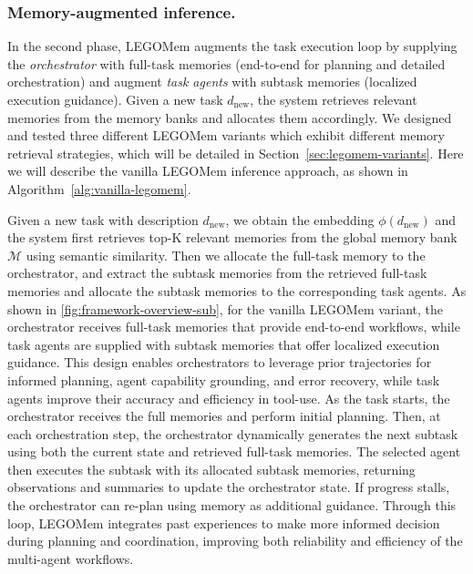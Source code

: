 \documentclass[sigconf]{aamas}
\newcommand{\legomem}{LEGOMem}
\begin{document}
\subsubsection{Memory-augmented inference.}

In the second phase, \legomem{} augments the task execution loop by supplying the \emph{orchestrator} with full-task memories (end-to-end for planning and detailed orchestration) and augment \emph{task agents} with subtask memories (localized execution guidance). Given a new task $d_{\text{new}}$, the system retrieves relevant memories from the memory banks and allocates them accordingly. We designed and tested three different \legomem{} variants which exhibit different memory retrieval strategies, which will be detailed in Section~\ref{sec:legomem-variants}. Here we will describe the vanilla \legomem{} inference approach, as shown in Algorithm~\ref{alg:vanilla-legomem}.

Given a new task with description $d_{\text{new}}$, we obtain the embedding $\phi(d_\text{new})$ and the system first retrieves top-K relevant memories from the global memory bank $\mathcal{M}$ using semantic similarity. Then we allocate the full-task memory to the orchestrator, and extract the subtask memories from the retrieved full-task memories and allocate the subtask memories to the corresponding task agents. 
As shown in \autoref{fig:framework-overview-sub}, for the vanilla \legomem{} variant, the orchestrator receives full-task memories that provide end-to-end workflows, while task agents are supplied with subtask memories that offer localized execution guidance. 
This design enables orchestrators to leverage prior trajectories for informed planning, agent capability grounding, and error recovery, while task agents improve their accuracy and efficiency in tool-use. 
As the task starts, the orchestrator receives the full memories and perform initial planning. Then, at each orchestration step, the orchestrator dynamically generates the next subtask using both the current state and retrieved full-task memories. 
The selected agent then executes the subtask with its allocated subtask memories, returning observations and summaries to update the orchestrator state. 
If progress stalls, the orchestrator can re-plan using memory as additional guidance. 
Through this loop, \legomem{} integrates past experiences to make more informed decision during planning and coordination, improving both reliability and efficiency of the multi-agent workflows.
\end{document}
